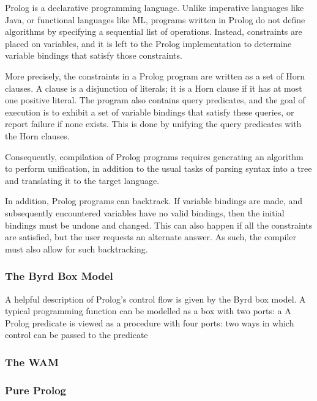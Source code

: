 \documentclass[12pt]{article}
\begin{document}
Prolog is a declarative programming language. Unlike imperative languages like Java, or functional languages like ML, programs written in Prolog do not define algorithms by specifying a sequential list of operations. Instead, constraints are placed on variables, and it is left to the Prolog implementation to determine variable bindings that satisfy those constraints. 

More precisely, the constraints in a Prolog program are written as a set of Horn clauses. A clause is a disjunction of literals; it is a Horn clause if it has at most one positive literal. The program also contains query predicates, and the goal of execution is to exhibit a set of variable bindings that satisfy these queries, or report failure if none exists. This is done by unifying the query predicates with the Horn clauses.

Consequently, compilation of Prolog programs requires generating an algorithm to perform unification, in addition to the usual tasks of parsing syntax into a tree and translating it to the target language.

In addition, Prolog programs can backtrack. If variable bindings are made, and subsequently encountered variables have no valid bindings, then the initial bindings must be undone and changed. This can also happen if all the constraints are satisfied, but the user requests an alternate answer. As such, the compiler must also allow for such backtracking.

\subsubsection{The Byrd Box Model}


A helpful description of Prolog's control flow is given by the Byrd box model. A typical programming function can be modelled as a box with two ports: a A Prolog predicate is viewed as a procedure with four ports: two ways in which control can be passed to the predicate

\subsubsection{The WAM}


\subsubsection{Pure Prolog}
\end{document}
